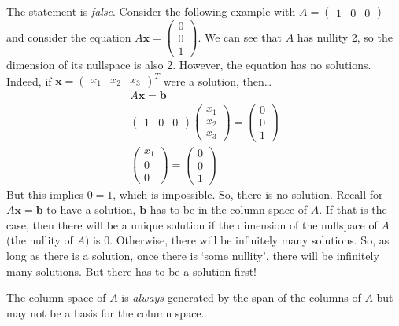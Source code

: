 \documentclass[11pt,letterpaper]{article}
\begin{document}
\sol The statement is \textit{false}. Consider the following example with $A= \begin{pmatrix} 1 & 0 & 0 \end{pmatrix}$ and consider the equation $A\mathbf{x}= \begin{pmatrix} 0 \\ 0 \\ 1 \end{pmatrix}$. We can see that $A$ has nullity 2, so the dimension of its nullspace is also 2. However, the equation has no solutions. Indeed, if $\mathbf{x}= \begin{pmatrix} x_1 & x_2 & x_3 \end{pmatrix}^T$ were a solution, then\dots
	\[
	\begin{gathered}
	A\mathbf{x}= \mathbf{b} \\
	\begin{pmatrix} 1 & 0 & 0 \end{pmatrix} \begin{pmatrix} x_1 \\ x_2 \\ x_3 \end{pmatrix}= \begin{pmatrix} 0 \\ 0 \\ 1 \end{pmatrix} \\
	\begin{pmatrix} x_1 \\ 0 \\ 0 \end{pmatrix}= \begin{pmatrix} 0 \\ 0 \\ 1 \end{pmatrix}
	\end{gathered}
	\]
But this implies $0= 1$, which is impossible. So, there is no solution. Recall for $A\mathbf{x}= \mathbf{b}$ to have a solution, $\mathbf{b}$ has to be in the column space of $A$. If that is the case, then there will be a unique solution if the dimension of the nullspace of $A$ (the nullity of $A$) is 0. Otherwise, there will be infinitely many solutions. So, as long as there is a solution, once there is `some nullity', there will be infinitely many solutions. But there has to be a solution first! \pvspace{1.3cm}



 The column space of $A$ is \textit{always} generated by the span of the columns of $A$ but may not be a basis for the column space. \pspace
\end{document}
